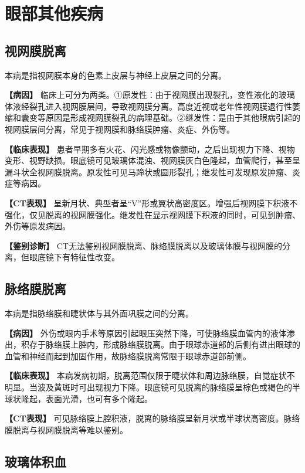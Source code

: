 \section{眼部其他疾病}

\subsection{视网膜脱离}

本病是指视网膜本身的色素上皮层与神经上皮层之间的分离。

\textbf{【病因】}
临床上可分为两类。①原发性：由于视网膜出现裂孔，变性液化的玻璃体液经裂孔进入视网膜层间，导致视网膜分离。高度近视或老年性视网膜退行性萎缩和囊变等原因是形成视网膜裂孔的病理基础。②继发性：是由于其他眼病引起的视网膜层间分离，常见于视网膜和脉络膜肿瘤、炎症、外伤等。

\textbf{【临床表现】}
患者早期多有火花、闪光感或物像颤动，之后出现视力下降、视物变形、视野缺损。眼底镜可见玻璃体混浊、视网膜灰白色隆起，血管爬行，甚至呈漏斗状全视网膜脱离。原发性可见马蹄状或圆形裂孔；继发性可发现原发肿瘤、炎症等病因。

\textbf{【CT表现】}
呈新月状、典型者呈“V”形或翼状高密度区。增强后视网膜下积液不强化，仅见脱离的视网膜强化。继发性在显示视网膜下积液的同时，可见到肿瘤、外伤等原发病因。

\textbf{【鉴别诊断】}
CT无法鉴别视网膜脱离、脉络膜脱离以及玻璃体膜与视网膜的分离，但眼底镜下有特征性改变。

\subsection{脉络膜脱离}

本病是指脉络膜和睫状体与其外面巩膜之间的分离。

\textbf{【病因】}
外伤或眼内手术等原因引起眼压突然下降，可使脉络膜血管内的液体渗出，积存于脉络膜上腔内，形成脉络膜脱离。由于眼球赤道部的后侧有进出眼球的血管和神经而起到加固作用，故脉络膜脱离常限于眼球赤道部前侧。

\textbf{【临床表现】}
本病发病初期，脱离范围仅限于睫状体和周边脉络膜，自觉症状不明显。当波及黄斑时可出现视力下降。眼底镜可见脱离的脉络膜呈棕色或褐色的半球状隆起，表面光滑，也可有多个隆起。

\textbf{【CT表现】}
可见脉络膜上腔积液，脱离的脉络膜呈新月状或半球状高密度。脉络膜脱离与视网膜脱离等难以鉴别。

\subsection{玻璃体积血}

